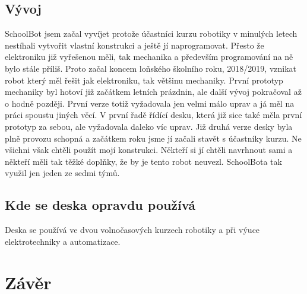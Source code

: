 \documentclass{template/socthesis}
\begin{document}
\section{Vývoj}

SchoolBot jsem začal vyvíjet protože účastníci kurzu robotiky v minulých letech nestíhali vytvořit vlastní konstrukci a ještě jí naprogramovat. Přesto že elektroniku již vyřešenou měli, tak mechanika a především programování na ně bylo stále příliš. Proto začal koncem loňského školního roku, 2018/2019, vznikat robot který měl řešit jak elektroniku, tak většinu mechaniky. První prototyp mechaniky byl hotoví již začátkem letních prázdnin, ale další vývoj pokračoval až o hodně později. První verze totiž vyžadovala jen velmi málo uprav a já měl na práci spoustu jiných věcí. V první řadě řídící desku, která již sice také měla první prototyp za sebou, ale vyžadovala daleko víc uprav. Již druhá verze desky byla plně provozu schopná a začátkem roku jsme jí začali stavět s účastníky kurzu. Ne všichni však chtěli použít mojí konstrukci. Někteří si jí chtěli navrhnout sami a někteří měli tak těžké doplňky, že by je tento robot neuvezl. SchoolBota tak využil jen jeden ze sedmi týmů.

\section{Kde se deska opravdu používá}
Deska se používá ve dvou volnočasových kurzech robotiky a při výuce elektrotechniky a automatizace.


\chapter*{Závěr}

\newpage

\listoffigures
{}
\end{document}
